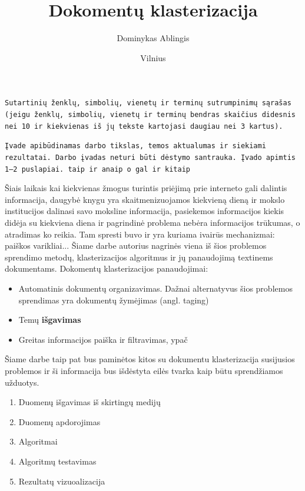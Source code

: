 \documentclass{VUMIFInfKursinis}
\title{Dokomentų klasterizacija}
\author{Dominykas Ablingis}
\date{Vilnius \\ \the\year}
\begin{document}
\maketitle

\tableofcontents

\texttt{Sutartinių ženklų, simbolių, vienetų ir terminų sutrumpinimų sąrašas (jeigu
ženklų, simbolių, vienetų ir terminų bendras skaičius didesnis nei 10 ir
kiekvienas iš jų tekste kartojasi daugiau nei 3 kartus).}

\texttt{Įvade apibūdinamas darbo tikslas, temos aktualumas ir siekiami rezultatai.
Darbo įvadas neturi būti dėstymo santrauka. Įvado apimtis 1–2 puslapiai.
taip ir anaip o gal ir kitaip}

Šiais laikais kai kiekvienas žmogus turintis priėjimą prie interneto gali dalintis informacija, daugybė knygu yra skaitmenizuojamos kiekvieną dieną ir mokslo institucijos dalinasi savo moksline informacija, pasiekemos informacijos kiekis didėja su kiekviena diena ir pagrindinė problema nebėra informacijos trūkumas, o atradimas ko reikia. Tam spresti buvo ir yra kuriama ivairūs mechanizmai: paiškos varikliai... Šiame darbe autorius nagrinės viena iš šios problemos sprendimo metodų, klasterizacijos algoritmus ir jų panaudojimą textinems dokumentams. %
Dokomentų klasterizacijos panaudojimai:
\begin{itemize}
	\item Automatinis dokumentų organizavimas. Dažnai alternatyvus šios problemos sprendimas yra dokumentų žymėjimas (angl. taging)
	\item Temų \textbf{išgavimas}
	\item Greitas informacijos paiška ir filtravimas, ypač
\end{itemize}
Šiame darbe taip pat bus paminėtos kitos su dokumentu klasterizacija susijusios problemos ir ši informacija bus išdėstyta eilės tvarka kaip būtu sprendžiamos užduotys.
\begin{enumerate}
	\item Duomenų išgavimas iš skirtingų medijų
	\item Duomenų apdorojimas
	\item Algoritmai
	\item Algoritmų testavimas
	\item Rezultatų vizuoalizacija
\end{enumerate}
\end{document}
